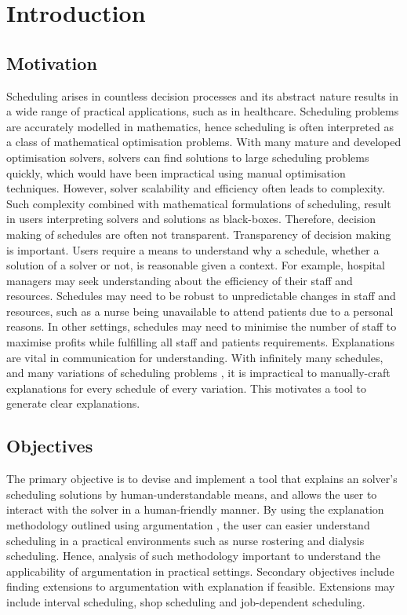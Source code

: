 \chapter{Introduction}
	
\section{Motivation}

Scheduling arises in countless decision processes and its abstract nature results in a wide range of practical applications, such as in healthcare.\cite{sanr} Scheduling problems are accurately modelled in mathematics, hence scheduling is often interpreted as a class of mathematical optimisation problems. With many mature and developed optimisation solvers, solvers can find solutions to large scheduling problems quickly, which would have been impractical using manual optimisation techniques. However, solver scalability and efficiency often leads to complexity. Such complexity combined with mathematical formulations of scheduling, result in users interpreting solvers and solutions as black-boxes. Therefore, decision making of schedules are often not transparent.
\linespace
Transparency of decision making is important. Users require a means to understand why a schedule, whether a solution of a solver or not, is reasonable given a context. For example, hospital managers may seek understanding about the efficiency of their staff and resources. Schedules may need to be robust to unpredictable changes in staff and resources, such as a nurse being unavailable to attend patients due to a personal reasons. In other settings, schedules may need to minimise the number of staff to maximise profits while fulfilling all staff and patients requirements.
\linespace
Explanations are vital in communication for understanding. With infinitely many schedules, and many variations of scheduling problems \cite{sta}, it is impractical to manually-craft explanations for every schedule of every variation. This motivates a tool to generate clear explanations.

\section{Objectives}

The primary objective is to devise and implement a tool that explains an solver's scheduling solutions by human-understandable means, and allows the user to interact with the solver in a human-friendly manner. By using the explanation methodology outlined using argumentation \cite{aes}, the user can easier understand scheduling in a practical environments such as nurse rostering and dialysis scheduling. Hence, analysis of such methodology important to understand the applicability of argumentation in practical settings.
\linespace
Secondary objectives include finding extensions to argumentation with explanation if feasible. Extensions may include interval scheduling, shop scheduling and job-dependent scheduling.

